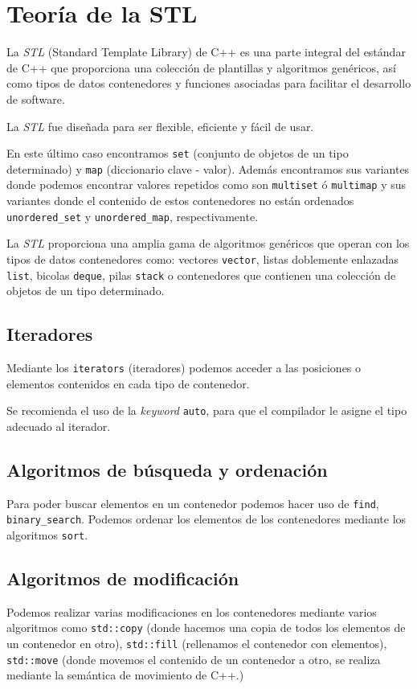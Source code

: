 \thispagestyle{empty}
\cleardoublepage
\chapter{Teoría de la STL}

La \textit{STL} (Standard Template Library) de C++ es una parte integral del estándar de C++ que proporciona una colección de plantillas y algoritmos genéricos, así como tipos de datos contenedores y funciones asociadas para facilitar el desarrollo de software.

La \textit{STL} fue diseñada para ser flexible, eficiente y fácil de usar.

En este último caso encontramos \texttt{set} (conjunto de objetos de un tipo determinado) y \texttt{map} (diccionario clave - valor).
Además encontramos sus variantes donde podemos encontrar valores repetidos como son \texttt{multiset} ó \texttt{multimap} y sus variantes donde el contenido de estos contenedores no están ordenados \texttt{unordered\_set} y \texttt{unordered\_map}, respectivamente.

La \textit{STL} proporciona una amplia gama de algoritmos genéricos que operan con los tipos de datos contenedores como: vectores \texttt{vector}, listas doblemente enlazadas \texttt{list},
bicolas \texttt{deque}, pilas \texttt{stack} o contenedores que contienen una colección de objetos de un tipo determinado.

\section{Iteradores}
Mediante los \texttt{iterators} (iteradores) podemos acceder a las posiciones o elementos contenidos en cada tipo de contenedor.

Se recomienda el uso de la \textit{keyword} \texttt{auto}, para que el compilador le asigne el tipo adecuado al iterador.
\section{Algoritmos de búsqueda y ordenación}
Para poder buscar elementos en un contenedor podemos hacer uso de \texttt{find}, \texttt{binary\_search}.
Podemos ordenar los elementos de los contenedores mediante los algoritmos \texttt{sort}.
\section{Algoritmos de modificación}
Podemos realizar varias modificaciones en los contenedores mediante varios algoritmos como \texttt{std::copy} (donde hacemos una copia de todos los elementos de un contenedor en otro),
\texttt{std::fill} (rellenamos el contenedor con elementos), \texttt{std::move} (donde movemos el contenido de un contenedor a otro, se realiza mediante la semántica de movimiento de C++.)

